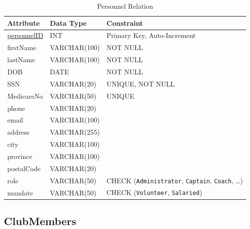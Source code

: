 \documentclass[11pt,a4paper]{article}
\begin{document}
\begin{table}[H]
\centering
\begin{tabular}{lll}
\toprule
Attribute & Data Type & Constraint \\
\midrule
\underline{personnelID} & INT & Primary Key, Auto-Increment \\
firstName & VARCHAR(100) & NOT NULL \\
lastName & VARCHAR(100) & NOT NULL \\
DOB & DATE & NOT NULL \\
SSN & VARCHAR(20) & UNIQUE, NOT NULL \\
MedicareNo & VARCHAR(50) & UNIQUE \\
phone & VARCHAR(20) & \\
email & VARCHAR(100) & \\
address & VARCHAR(255) & \\
city & VARCHAR(100) & \\
province & VARCHAR(100) & \\
postalCode & VARCHAR(20) & \\
role & VARCHAR(50) & CHECK (\texttt{Administrator}, \texttt{Captain}, \texttt{Coach}, \dots) \\
mandate & VARCHAR(50) & CHECK (\texttt{Volunteer}, \texttt{Salaried}) \\
\bottomrule
\end{tabular}
\caption{Personnel Relation}
\end{table}


\subsection{ClubMembers}
\end{document}
